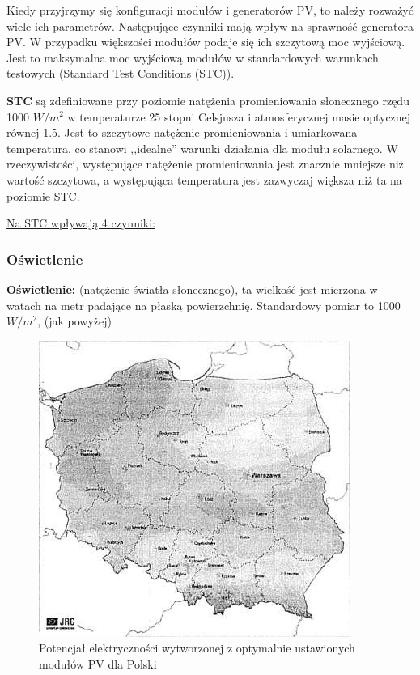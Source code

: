 \documentclass[12pt,a4paper]{article}
\begin{document}
Kiedy przyjrzymy się konfiguracji modułów i generatorów PV, to należy rozważyć wiele ich parametrów. Następujące czynniki mają wpływ na sprawność generatora PV. W przypadku większości modułów podaje się ich szczytową moc wyjściową. Jest to maksymalna moc wyjściową modułów w standardowych warunkach testowych (Standard Test Conditions (STC)). 

\textbf{STC}  są zdefiniowane przy poziomie natężenia promieniowania słonecznego rzędu 1000 ${W/m^{2}}$ w temperaturze 25 stopni Celsjusza i atmosferycznej masie optycznej równej 1.5. Jest to szczytowe natężenie promieniowania i umiarkowana temperatura, co stanowi ,,idealne''  warunki działania dla modułu solarnego. W rzeczywistości, występujące natężenie promieniowania jest znacznie mniejsze niż wartość szczytowa, a występująca temperatura jest zazwyczaj większa niż ta na poziomie STC. 

\underline{Na STC wpływają 4 czynniki:} 
\subsubsection{Oświetlenie}

\textbf{Oświetlenie:} (natężenie światła słonecznego), ta wielkość jest mierzona w watach na metr padające na płaską powierzchnię. Standardowy pomiar to 1000 ${W/m^{2}}$, (jak powyżej) 

\begin{figure}[H]
\centering
\caption{Potencjał elektryczności wytworzonej z optymalnie ustawionych 
modułów PV dla Polski}
\includegraphics[natwidth=10.21cm,natheight=9.71cm]{media/image9.jpg}
\end{figure}
 
\end{document}
